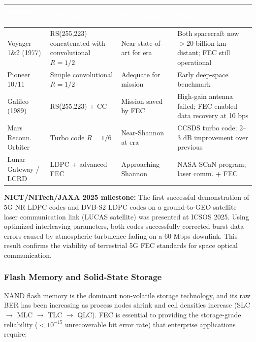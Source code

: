 \documentclass[11pt,letterpaper]{article}
\newcommand{\tableheader}[1]{\textbf{\sffamily\textcolor{white}{#1}}}
\begin{document}
\begin{center}
\begin{tabularx}{\textwidth}{L{2.5cm}L{4cm}L{3cm}X}
\toprule
{}
\tableheader{Mission / Era} & \tableheader{FEC Scheme} & \tableheader{Performance} & \tableheader{Notes} \\
\midrule
Voyager 1\&2 (1977) & RS(255,223) concatenated with convolutional $R=1/2$ & Near state-of-art for era & Both spacecraft now $>20$ billion km distant; FEC still operational \\
Pioneer 10/11 & Simple convolutional $R=1/2$ & Adequate for mission & Early deep-space benchmark \\
Galileo (1989) & RS(255,223) + CC & Mission saved by FEC & High-gain antenna failed; FEC enabled data recovery at 10 bps \\
Mars Reconn. Orbiter & Turbo code $R=1/6$ & Near-Shannon at era & CCSDS turbo code; 2--3 dB improvement over previous \\
Lunar Gateway / LCRD & LDPC + advanced FEC & Approaching Shannon & NASA SCaN program; laser comm. + FEC \\
\bottomrule
\end{tabularx}
\end{center}

\textbf{NICT/NITech/JAXA 2025 milestone:} The first successful demonstration of 5G NR LDPC codes and DVB-S2 LDPC codes on a ground-to-GEO satellite laser communication link (LUCAS satellite) was presented at ICSOS 2025. Using optimized interleaving parameters, both codes successfully corrected burst data errors caused by atmospheric turbulence fading on a 60 Mbps downlink. This result confirms the viability of terrestrial 5G FEC standards for space optical communication.

\subsubsection{Flash Memory and Solid-State Storage}

NAND flash memory is the dominant non-volatile storage technology, and its raw BER has been increasing as process nodes shrink and cell densities increase (SLC $\to$ MLC $\to$ TLC $\to$ QLC). FEC is essential to providing the storage-grade reliability ($<10^{-15}$ unrecoverable bit error rate) that enterprise applications require:
\end{document}
